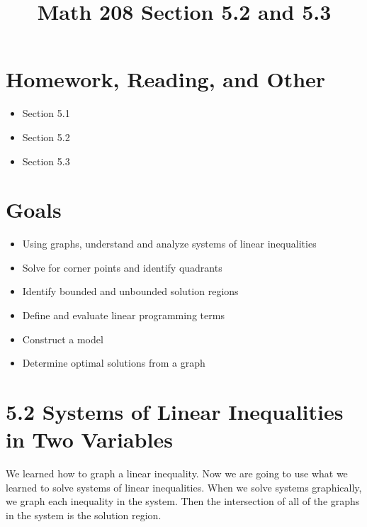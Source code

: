 \documentclass[14pt]{extarticle}
\title{\vspace{-5ex}Math 208 Section 5.2 and 5.3}
\date{\vspace{-10ex}}
\begin{document}
\maketitle		
\section*{Homework, Reading, and Other}
\begin{itemize}
	\item Section 5.1
	\item Section 5.2
	\item Section 5.3
\end{itemize}

\section*{Goals}
\begin{itemize}
	\item Using graphs, understand and analyze systems of linear inequalities
	\item Solve for corner points and identify quadrants
	\item Identify bounded and unbounded solution regions
	\item Define and evaluate linear programming terms
	\item Construct a model
	\item Determine optimal solutions from a graph
\end{itemize}

\section*{5.2 Systems of Linear Inequalities in Two Variables}
We learned how to graph a linear inequality. Now we are going to use what we learned to solve systems of linear inequalities. When we solve systems graphically, we graph each inequality in the system. Then the intersection of all of the graphs in the system is the solution region.
\end{document}
